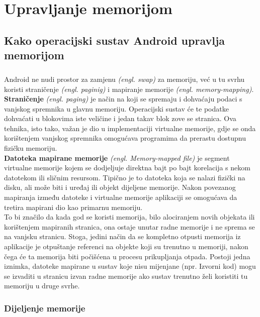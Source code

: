\documentclass[times, utf8, zavrsni]{fer}
\begin{document}
\chapter{Upravljanje memorijom}
\section{Kako operacijski sustav Android upravlja memorijom}
\paragraph{}
Android ne nudi prostor za zamjenu \textit{(engl. swap)} za memoriju, već u tu svrhu koristi straničenje \textit{(engl. paginig)} i mapiranje memorije \textit{(engl. memory-mapping)}.\\

\textbf{Straničenje} \textit{(engl. paging)} je način na koji se spremaju i dohvaćaju podaci s vanjskog spremnika u glavnu memoriju. Operacijski sustav će te podatke dohvaćati u blokovima iste veličine i jedan takav blok zove se stranica. Ova tehnika, isto tako, važan je dio u implementaciji virtualne memorije, gdje se onda korištenjem vanjskog spremnika omogućava programima da prerastu dostupnu fizičku memoriju.\\

\textbf{Datoteka mapirane memorije} \textit{(engl. Memory-mapped file)} je segment virtualne memorije kojem se dodjeljuje direktna bajt po bajt korelacija s nekom datotekom ili sličnim resursom. Tipično je to datoteka koja se nalazi fizički na disku, ali može biti i uređaj ili objekt dijeljene memorije. Nakon povezanog mapiranja između datoteke i virtualne memorije aplikaciji se omogućava da tretira mapirani dio kao primarnu memoriju.\\

To bi značilo da kada god se koristi memorija, bilo alociranjem novih objekata ili korištenjem mapiranih stranica, ona ostaje unutar radne memorije i ne sprema se na vanjsku stranicu. Stoga, jedini način da se kompletno otpusti memorija iz aplikacije je otpuštanje referenci na objekte koji su trenutno u memoriji, nakon čega će ta memorija biti počišćena u procesu prikupljanja otpada. Postoji jedna iznimka, datoteke mapirane u sustav koje nisu mijenjane (npr. Izvorni kod) mogu se izvaditi u stranicu izvan radne memorije ako sustav trenutno želi koristiti tu memoriju u druge svrhe.

\subsection{Dijeljenje memorije}
\end{document}
